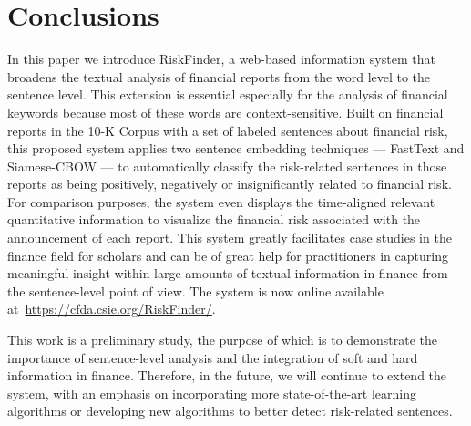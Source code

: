\documentclass[10pt,conference,letterpaper]{IEEEtran}
\begin{document}
\section{Conclusions}\label{sec:conclusion}
    In this paper we introduce RiskFinder, a web-based information system that broadens the textual analysis of financial reports from the word level to the sentence level. This extension is essential especially for the analysis of financial keywords because most of these words are context-sensitive. Built on financial reports in the 10-K Corpus with a set of labeled sentences about financial risk, this proposed system applies two sentence embedding techniques --- FastText and Siamese-CBOW --- to automatically classify the risk-related sentences in those reports as being positively, negatively or insignificantly related to financial risk. For comparison purposes, the system even displays the time-aligned relevant quantitative information to visualize the financial risk associated with the announcement of each report. This system greatly facilitates case studies in the finance field for scholars and can be of great help for practitioners in capturing meaningful insight within large amounts of textual information in finance from the sentence-level point of view. The system is now online available at~\url{https://cfda.csie.org/RiskFinder/}.

    This work is a preliminary study, the purpose of which is to demonstrate the importance of sentence-level analysis and the integration of soft and hard information in finance. Therefore, in the future, we will continue to extend the system, with an emphasis on incorporating more state-of-the-art learning algorithms or developing new algorithms to better detect risk-related sentences.



\end{document}

